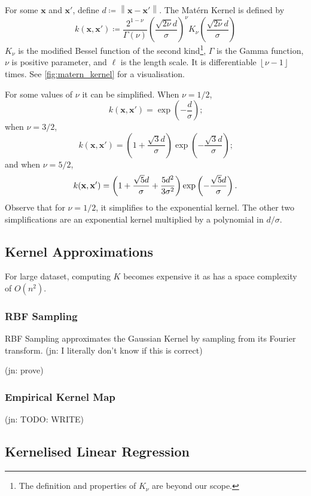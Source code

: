 \documentclass[11pt,twoside,openright]{report}
\newcommand\bx{\mathbf{x}}
\newcommand\norm[1]{\left\|#1\right\|}
\newcommand\floor[1]{\left\lfloor#1\right\rfloor}
\newcommand\jn[1]{{\color{red}(jn: #1)}}
\begin{document}
For some $\bx$ and $\bx'$, define $d \coloneqq \norm{\bx - \bx'}$. The Mat\'ern Kernel is defined by \[
    k(\bx, \bx') \coloneqq \frac{2^{1-\nu}}{\Gamma(\nu)}\left(\frac{\sqrt{2\nu}d}{\sigma}\right)^\nu K_\nu\left(\frac{\sqrt{2\nu}d}{\sigma}\right)
\]$K_\nu$ is the modified Bessel function of the second kind\footnote{The definition and properties of $K_{\nu}$ are beyond our scope.}, $\Gamma$ is the Gamma function, $\nu$ is positive parameter, and $\ell$ is the length scale. It is differentiable $\floor{\nu-1}$ times. See \cref{fig:matern_kernel} for a visualisation.

For some values of $\nu$ it can be simplified. When $\nu = 1/2$,
 \[
   k(\bx, \bx') = \exp\left(-\frac{d}{\sigma}\right) \text{;}
 \] when $\nu=3/2$, \[
   k(\bx, \bx') = \left(1 + \frac{\sqrt{3}d}{\sigma}\right)\exp\left(-\frac{\sqrt{3}d}{\sigma}\right) \text{;}
 \] and when $\nu = 5/2$,\[
  k(\bx, \bx') = \left(1 + \frac{\sqrt{5}d}{\sigma} + \frac{5d^2}{3\sigma^2}\right)\exp\left(-\frac{\sqrt{5}d}{\sigma}\right) \text.
 \] Observe that for $\nu=1/2$, it simplifies to the exponential kernel. The other two simplifications are an exponential kernel multiplied by a polynomial in $d/\sigma$.
\subsection{Kernel Approximations}

For large dataset, computing $K$ becomes expensive it as has a space complexity of $O(n^2)$.

\subsubsection{RBF Sampling}

RBF Sampling approximates the Gaussian Kernel by sampling from its Fourier transform. \jn{I literally don't know if this is correct}

\jn{prove}

\subsubsection{Empirical Kernel Map}

\jn{TODO: WRITE}


\subsection{Kernelised Linear Regression}
\end{document}

